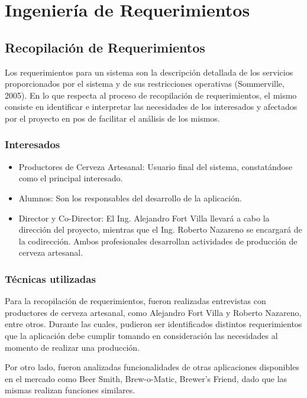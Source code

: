 \chapter{Ingeniería de Requerimientos}
\section{Recopilación de Requerimientos}
    \par
    Los requerimientos para un sistema son la descripción detallada de los servicios proporcionados por el sistema y de sus restricciones operativas (Sommerville, 2005). En lo que respecta al proceso de recopilación de requerimientos, el mismo consiste en identificar e interpretar las necesidades de los interesados y afectados por el proyecto en pos de facilitar el análisis de los mismos.
    
    \subsection{Interesados}
    \begin{itemize}
        \item Productores de Cerveza Artesanal: Usuario final del sistema, constatándose como el principal interesado.
        \item Alumnos: Son los responsables del desarrollo de la aplicación.
        \item Director y Co-Director: El Ing. Alejandro Fort Villa llevará a cabo la dirección del proyecto, mientras que el Ing. Roberto Nazareno se encargará de la codirección. Ambos profesionales desarrollan actividades de producción de cerveza artesanal.
    \end{itemize}
    
    \subsection{Técnicas utilizadas}
    \par
    Para la recopilación de requerimientos, fueron realizadas entrevistas con productores de cerveza artesanal, como Alejandro Fort Villa y Roberto Nazareno, entre otros. Durante las cuales, pudieron ser identificados distintos requerimientos que la aplicación debe cumplir tomando en consideración las necesidades al momento de realizar una producción. 
    \par
    Por otro lado, fueron analizadas funcionalidades de otras aplicaciones disponibles en el mercado como Beer Smith, Brew-o-Matic, Brewer’s Friend, dado que las mismas realizan funciones similares.
    
